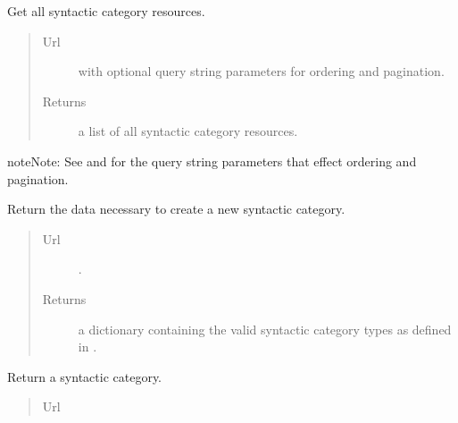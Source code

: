 \documentclass[letterpaper,10pt,english]{sphinxmanual}
\begin{document}
\begin{fulllineitems}
\begin{fulllineitems}
\label{api:onlinelinguisticdatabase.controllers.syntacticcategories.SyntacticcategoriesController.index}
Get all syntactic category resources.
\begin{quote}\begin{description}
\item[{Url }] \leavevmode
{} with optional query string parameters
for ordering and pagination.

\item[{Returns}] \leavevmode
a list of all syntactic category resources.

\end{description}\end{quote}

\begin{notice}{note}{Note:}
See  and  for the
query string parameters that effect ordering and pagination.
\end{notice}

\end{fulllineitems}


\begin{fulllineitems}
\label{api:onlinelinguisticdatabase.controllers.syntacticcategories.SyntacticcategoriesController.new}
Return the data necessary to create a new syntactic category.
\begin{quote}\begin{description}
\item[{Url }] \leavevmode
{}.

\item[{Returns}] \leavevmode
a dictionary containing the valid syntactic category types as
defined in .

\end{description}\end{quote}

\end{fulllineitems}


\begin{fulllineitems}
\label{api:onlinelinguisticdatabase.controllers.syntacticcategories.SyntacticcategoriesController.show}
Return a syntactic category.
\begin{quote}\begin{description}
\item[{Url }] \leavevmode
{}


\end{description}
\end{quote}
\end{fulllineitems}
\end{fulllineitems}
\end{document}

